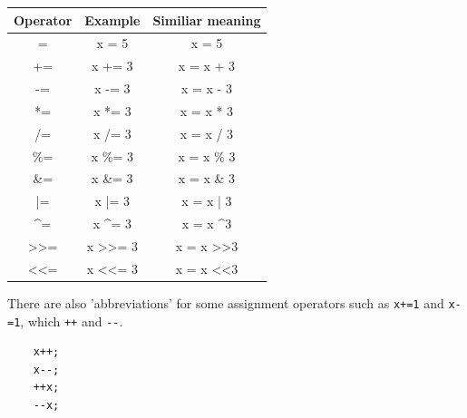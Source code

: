 \begin{center}
	\begin{tabular}{|c|c|c|}
		\hline
		\multicolumn{1}{|l|}{\textbf{Operator}} & \multicolumn{1}{l|}{\textbf{Example}}      & \multicolumn{1}{l|}{\textbf{Similiar meaning}} \\ \hline
		=                              & x = 5                             & x = 5                                 \\ \hline
		+=                             & x += 3                            & x = x + 3                             \\ \hline
		-=                             & x -= 3                            & x = x - 3                             \\ \hline
		*=                             & x *= 3                            & x = x * 3                             \\ \hline
		/=                             & x /= 3                            & x = x / 3                             \\ \hline
		\%=                            & x \%= 3                           & x = x \% 3                            \\ \hline
		\&=                            & x \&= 3                           & x = x \& 3                            \\ \hline
		|=                             & x |= 3                            & x = x | 3                             \\ \hline
		\textasciicircum{}=            & x \textasciicircum{}= 3           & x = x \textasciicircum 3              \\ \hline
		\textgreater{}\textgreater{}=  & x \textgreater{}\textgreater{}= 3 & x = x \textgreater{}\textgreater 3    \\ \hline
		\textless{}\textless{}=        & x \textless{}\textless{}= 3       & x = x \textless{}\textless 3          \\ \hline
	\end{tabular}
\end{center}
There are also 'abbreviations' for some assignment operators such as \verb*|x+=1| and \verb*|x-=1|, which \verb*|++| and \verb*|--|.
\begin{verbatim}
    x++;
    x--;
    ++x;
    --x;
\end{verbatim}


